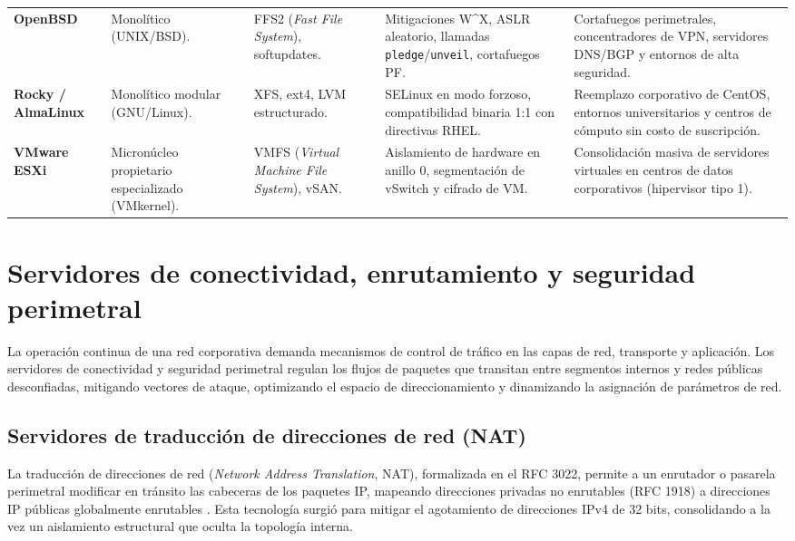 \documentclass[12pt]{article}
\begin{document}
\begin{table}[H]
\begin{tabularx}{\textwidth}{>{\centering\arraybackslash}m{2.3cm} X X X X}
\addlinespace
\textbf{OpenBSD} & Monolítico (UNIX/BSD). & FFS2 (\textit{Fast File System}), softupdates. & Mitigaciones W\^{}X, ASLR aleatorio, llamadas \texttt{pledge}/\texttt{unveil}, cortafuegos PF. & Cortafuegos perimetrales, concentradores de VPN, servidores DNS/BGP y entornos de alta seguridad. \\
\addlinespace
\textbf{Rocky / AlmaLinux} & Monolítico modular (GNU/Linux). & XFS, ext4, LVM estructurado. & SELinux en modo forzoso, compatibilidad binaria 1:1 con directivas RHEL. & Reemplazo corporativo de CentOS, entornos universitarios y centros de cómputo sin costo de suscripción. \\
\addlinespace
\textbf{VMware ESXi} & Micronúcleo propietario especializado (VMkernel). & VMFS (\textit{Virtual Machine File System}), vSAN. & Aislamiento de hardware en anillo 0, segmentación de vSwitch y cifrado de VM. & Consolidación masiva de servidores virtuales en centros de datos corporativos (hipervisor tipo 1). \\
\bottomrule
\end{tabularx}
\end{table}

\section{Servidores de conectividad, enrutamiento y seguridad perimetral}
\label{sec:servidoresConectividadSeguridad}

La operación continua de una red corporativa demanda mecanismos de control de tráfico en las capas de red, transporte y aplicación. Los servidores de conectividad y seguridad perimetral regulan los flujos de paquetes que transitan entre segmentos internos y redes públicas desconfiadas, mitigando vectores de ataque, optimizando el espacio de direccionamiento y dinamizando la asignación de parámetros de red.

\subsection{Servidores de traducción de direcciones de red (NAT)}
\label{sec:servidoresNat}

La traducción de direcciones de red (\textit{Network Address Translation}, NAT), formalizada en el RFC 3022, permite a un enrutador o pasarela perimetral modificar en tránsito las cabeceras de los paquetes IP, mapeando direcciones privadas no enrutables (RFC 1918) a direcciones IP públicas globalmente enrutables \parencite[\S 1, pp.\ 1--3]{rfc3022}. Esta tecnología surgió para mitigar el agotamiento de direcciones IPv4 de 32 bits, consolidando a la vez un aislamiento estructural que oculta la topología interna.
\end{document}
